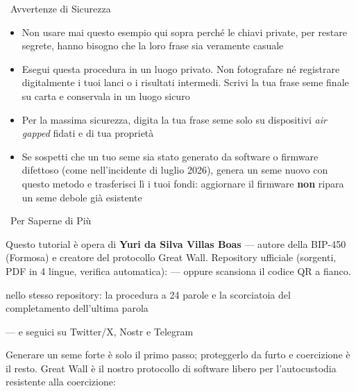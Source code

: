 \documentclass[10pt]{article}
\begin{document}
\begin{warnbox}{\faExclamationTriangle~Avvertenze di Sicurezza}
\begin{itemize}[itemsep=1pt]
 \item Non usare mai questo esempio qui sopra perché le chiavi private, per restare segrete, hanno bisogno che la loro frase sia veramente casuale
 \item Esegui questa procedura in un luogo privato. Non fotografare né registrare digitalmente i tuoi lanci o i risultati intermedi. Scrivi la tua frase seme finale su carta e conservala in un luogo sicuro
 \item Per la massima sicurezza, digita la tua frase seme solo su dispositivi \textit{air gapped} fidati e di tua proprietà
 \item Se sospetti che un tuo seme sia stato generato da software o firmware difettoso (come nell'incidente di luglio 2026), genera un seme nuovo con questo metodo e trasferisci lì i tuoi fondi: aggiornare il firmware \textbf{non} ripara un seme debole già esistente
\end{itemize}
\end{warnbox}

\begin{infobox}{\faInfoCircle~Per Saperne di Più}
\begin{minipage}[c]{0.8\textwidth}
Questo tutorial è opera di \textbf{Yuri da Silva Villas Boas} --- autore della BIP-450 (Formosa) e creatore del protocollo Great Wall. Repository ufficiale (sorgenti, PDF in 4 lingue, verifica automatica): \repolink --- oppure scansiona il codice QR a fianco.

\begin{description}[itemsep=1pt]
 \item [Edizione estesa --- 24 parole:] nello stesso repository: la procedura a 24 parole e la scorciatoia del completamento dell'ultima parola
 \item [Altri tutorial, corsi e comunità:] \sitelink --- e seguici su Twitter/X, Nostr e Telegram
 \item [Great Wall:] Generare un seme forte è solo il primo passo; proteggerlo da furto e coercizione è il resto. Great Wall è il nostro protocollo di software libero per l'autocustodia resistente alla coercizione: \gwlink
\end{description}

\end{minipage}%
\hfill
\begin{minipage}[c]{0.15\textwidth}
\centering
\repoqr
\end{minipage}
\end{infobox}

\end{document}
